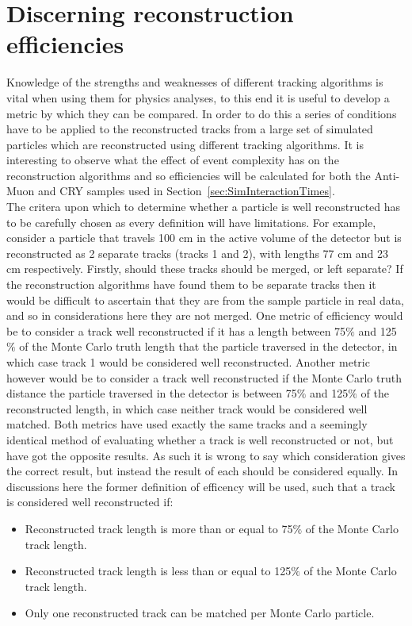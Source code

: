 \section{Discerning reconstruction efficiencies} \label{sec:SimRecoEffic} %
Knowledge of the strengths and weaknesses of different tracking algorithms is vital when using them for physics analyses, to this end it is useful to develop a metric by which they can be compared. In order to do this a series of conditions have to be applied to the reconstructed tracks from a large set of simulated particles which are reconstructed using different tracking algorithms. It is interesting to observe what the effect of event complexity has on the reconstruction algorithms and so efficiencies will be calculated for both the Anti-Muon and CRY samples used in Section~\ref{sec:SimInteractionTimes}. \\

The critera upon which to determine whether a particle is well reconstructed has to be carefully chosen as every definition will have limitations. For example, consider a particle that travels 100 cm in the active volume of the detector but is reconstructed as 2 separate tracks (tracks 1 and 2), with lengths 77 cm and 23 cm respectively. Firstly, should these tracks should be merged, or left separate? If the reconstruction algorithms have found them to be separate tracks then it would be difficult to ascertain that they are from the sample particle in real data, and so in considerations here they are not merged. One metric of efficiency would be to consider a track well reconstructed if it has a length between 75$\%$ and 125$\%$ of the Monte Carlo truth length that the particle traversed in the detector, in which case track 1 would be considered well reconstructed. Another metric however would be to consider a track well reconstructed if the Monte Carlo truth distance the particle traversed in the detector is between 75$\%$ and 125$\%$ of the reconstructed length, in which case neither track would be considered well matched. Both metrics have used exactly the same tracks and a seemingly identical method of evaluating whether a track is well reconstructed or not, but have got the opposite results. As such it is wrong to say which consideration gives the correct result, but instead the result of each should be considered equally. In discussions here the former definition of efficency will be used, such that a track is considered well reconstructed if:
\begin{itemize}
\item Reconstructed track length is more than or equal to 75$\%$ of the Monte Carlo track length.
\item Reconstructed track length is less than or equal to 125$\%$ of the Monte Carlo track length.
\item Only one reconstructed track can be matched per Monte Carlo particle.
\end{itemize}

